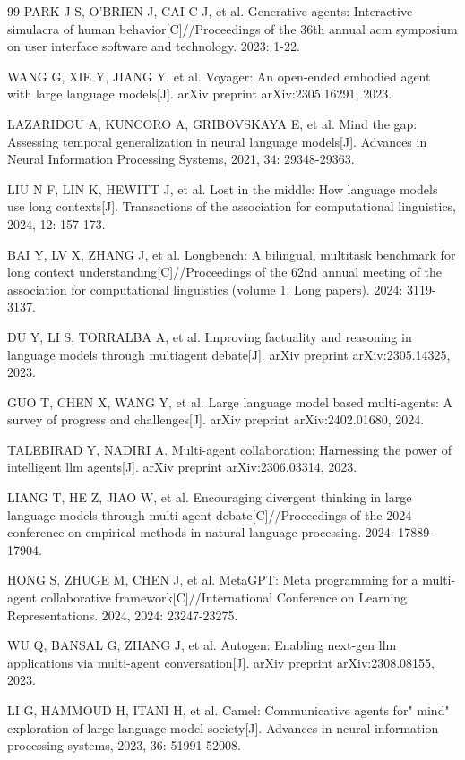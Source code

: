 \begin{thebibliography}{99}
PARK J S, O'BRIEN J, CAI C J, et al. Generative agents: Interactive simulacra of human behavior[C]//Proceedings of the 36th annual acm symposium on user interface software and technology. 2023: 1-22.

WANG G, XIE Y, JIANG Y, et al. Voyager: An open-ended embodied agent with large language models[J]. arXiv preprint arXiv:2305.16291, 2023.

LAZARIDOU A, KUNCORO A, GRIBOVSKAYA E, et al. Mind the gap: Assessing temporal generalization in neural language models[J]. Advances in Neural Information Processing Systems, 2021, 34: 29348-29363.

LIU N F, LIN K, HEWITT J, et al. Lost in the middle: How language models use long contexts[J]. Transactions of the association for computational linguistics, 2024, 12: 157-173.

BAI Y, LV X, ZHANG J, et al. Longbench: A bilingual, multitask benchmark for long context understanding[C]//Proceedings of the 62nd annual meeting of the association for computational linguistics (volume 1: Long papers). 2024: 3119-3137.

DU Y, LI S, TORRALBA A, et al. Improving factuality and reasoning in language models through multiagent debate[J]. arXiv preprint arXiv:2305.14325, 2023.

GUO T, CHEN X, WANG Y, et al. Large language model based multi-agents: A survey of progress and challenges[J]. arXiv preprint arXiv:2402.01680, 2024.

TALEBIRAD Y, NADIRI A. Multi-agent collaboration: Harnessing the power of intelligent llm agents[J]. arXiv preprint arXiv:2306.03314, 2023.

LIANG T, HE Z, JIAO W, et al. Encouraging divergent thinking in large language models through multi-agent debate[C]//Proceedings of the 2024 conference on empirical methods in natural language processing. 2024: 17889-17904.

HONG S, ZHUGE M, CHEN J, et al. MetaGPT: Meta programming for a multi-agent collaborative framework[C]//International Conference on Learning Representations. 2024, 2024: 23247-23275.

WU Q, BANSAL G, ZHANG J, et al. Autogen: Enabling next-gen llm applications via multi-agent conversation[J]. arXiv preprint arXiv:2308.08155, 2023.

LI G, HAMMOUD H, ITANI H, et al. Camel: Communicative agents for" mind" exploration of large language model society[J]. Advances in neural information processing systems, 2023, 36: 51991-52008.


\end{thebibliography}
